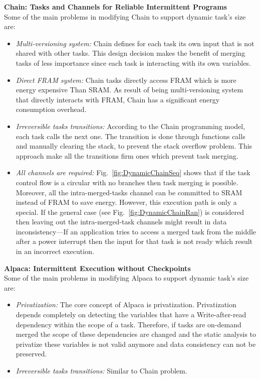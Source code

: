 \documentclass[sigconf,anonymous,review]{acmart}
\begin{document}
\noindent\textbf{Chain: Tasks and Channels for Reliable Intermittent Programs } \\
Some of the main problems in modifying Chain to support dynamic task's size are:

\begin{itemize}
	\item \emph{Multi-versioning system:} Chain defines for each task its own input that is not shared with other tasks. This design decision makes the benefit of merging tasks of less importance since each task is interacting with its own variables. 
	\item \emph{Direct FRAM system:} Chain tasks directly access FRAM which is more energy expensive Than SRAM. As result of being multi-versioning system that directly interacts with FRAM, Chain has a significant energy consumption overhead. 
	\item \emph{Irreversible tasks transitions:} According to the Chain programming model, each task calls the next one. The transition is done through functions calls and manually clearing the stack, to prevent the stack overflow problem. This approach make all the transitions firm ones which prevent task merging.
	\item \emph{All channels are required:} Fig.~\ref{fig:DynamicChainSeq} shows that if the task control flow is a circular with no branches then task merging is possible. Moreover, all the intra-merged-tasks channel can be committed to SRAM instead of FRAM to save energy. However, this execution path is only a special. If the general case (see Fig.~\ref{fig:DynamicChainRan}) is considered then leaving out the intra-merged-task channels might result in data inconsistency---If an application tries to access a merged task from the middle after a power interrupt then the input for that task is not ready which result in an incorrect execution. 


\end{itemize}


\noindent\textbf{Alpaca: Intermittent Execution without Checkpoints} \\
Some of the main problems in modifying Alpaca to support dynamic task's size are:

\begin{itemize}
	\item \emph{Privatization:} The core concept of Alpaca is privatization. Privatization depends completely on detecting the variables that have a Write-after-read dependency within the scope of a task. Therefore, if tasks are on-demand merged the scope of these dependencies are changed and the static analysis to privatize these variables is not valid anymore and data consistency can not be preserved.  

	\item \emph{Irreversible tasks transitions:} Similar to Chain problem. 

\end{itemize}
\end{document}
